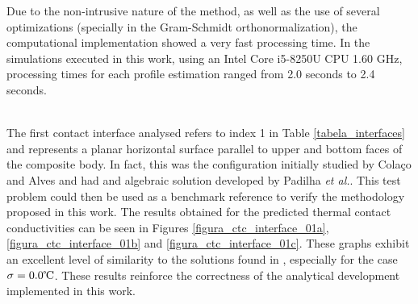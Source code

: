 \documentclass[conference,compsoc,fleqn]{IEEEtran}
\begin{document}
Due to the non-intrusive nature of the method, as well as the use of several optimizations (specially in the Gram-Schmidt orthonormalization), the computational implementation showed a very fast processing time. In the simulations executed in this work, using an Intel Core\textsuperscript{\texttrademark} i5-8250U CPU 1.60 GHz, processing times for each profile estimation ranged from 2.0 seconds to 2.4 seconds.
\\

\\


The first contact interface analysed refers to index 1 in Table \ref{tabela_interfaces} and represents a planar horizontal surface parallel to upper and bottom faces of the composite body. In fact, this was the configuration initially studied by Colaço and Alves \cite{reciproc_3} and had and algebraic solution developed by Padilha \textit{et al.}\cite{artigo_padilha_3}. This test problem could then be used as a benchmark reference to verify the methodology proposed in this work. The results obtained for the predicted thermal contact conductivities can be seen in Figures \ref{figura_ctc_interface_01a}, \ref{figura_ctc_interface_01b} and \ref{figura_ctc_interface_01c}. These graphs exhibit an excellent level of similarity to the solutions found in \cite{artigo_padilha_3}, especially for the case $\sigma = \text{0.0}\celsius$. These results reinforce the correctness of the analytical development implemented in this work. 
\end{document}
